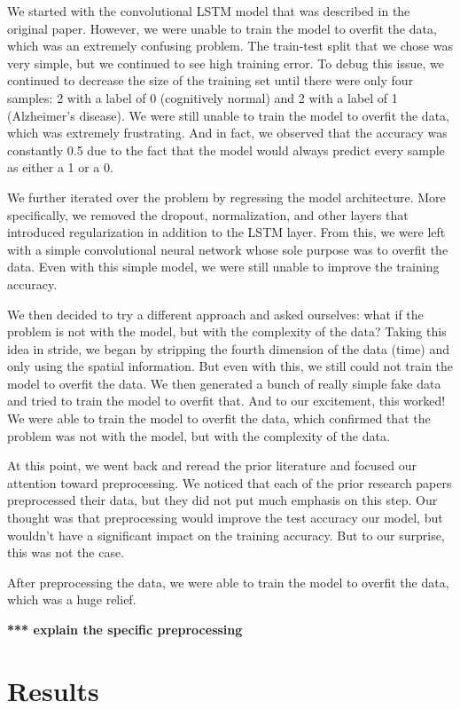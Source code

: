 \documentclass[10pt]{article}
\begin{document}
	We started with the convolutional LSTM model that was described in the original paper. However, we were unable to train the model to overfit the data, which was an extremely confusing problem. The train-test split that we chose was very simple, but we continued to see high training error. To debug this issue, we continued to decrease the size of the training set until there were only four samples: 2 with a label of 0 (cognitively normal) and 2 with a label of 1 (Alzheimer's disease). We were still unable to train the model to overfit the data, which was extremely frustrating. And in fact, we observed that the accuracy was constantly 0.5 due to the fact that the model would always predict every sample as either a 1 or a 0.

	We further iterated over the problem by regressing the model architecture. More specifically, we removed the dropout, normalization, and other layers that introduced regularization in addition to the LSTM layer. From this, we 
	were left with a simple convolutional neural network whose sole purpose was to overfit the data. Even with this simple model, we were still unable to improve the training accuracy. 

	We then decided to try a different approach and asked ourselves: what if the problem is not with the model, but with the complexity of the data? Taking this idea in stride, we began by stripping the fourth dimension of the data (time) and only using the spatial information. But even with this, we still could not train the model to overfit the data. We then generated a bunch of really simple fake data and tried to train the model to overfit that. And to our excitement, this worked! We were able to train the model to overfit the data, which confirmed that the problem was not with the model, but with the complexity of the data.

	At this point, we went back and reread the prior literature and focused our attention toward preprocessing. We noticed that each of the prior research papers preprocessed their data, but they did not put much emphasis on this step. Our thought was that preprocessing would improve the test accuracy our model, but wouldn't have a significant impact on the training accuracy. But to our surprise, this was not the case. 
	
	After preprocessing the data, we were able to train the model to overfit the data, which was a huge relief.

	\textbf{*** explain the specific preprocessing}
	\section{Results}
\end{document}

